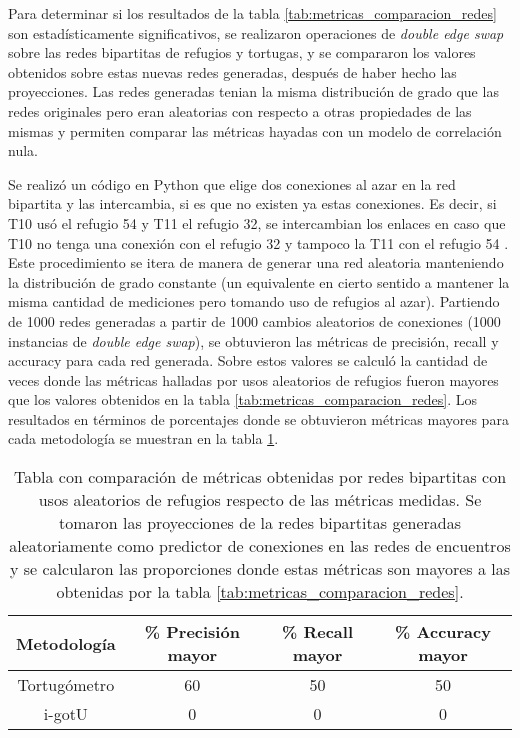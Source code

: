 Para determinar si los resultados de la tabla \ref{tab:metricas_comparacion_redes} son estadísticamente significativos, se realizaron operaciones de \textit{double edge swap} \cite{bipartitasTortusPaper} sobre las redes bipartitas de refugios y tortugas, y se compararon los valores obtenidos sobre estas nuevas redes generadas, después de haber hecho las proyecciones. Las redes generadas tenian la misma distribución de grado que las redes originales pero eran aleatorias con respecto a otras propiedades de las mismas y permiten comparar las métricas hayadas con un modelo de correlación nula. 

Se realizó un código en Python que elige dos conexiones al azar en la red bipartita y las intercambia, si es que no existen ya estas conexiones. Es decir, si T10 usó el refugio 54 y T11 el refugio 32, se intercambian los enlaces en caso que T10 no tenga una conexión con el refugio 32 y tampoco la T11 con el refugio 54 \cite{github}. Este procedimiento se itera de manera de generar una red aleatoria manteniendo la distribución de grado constante (un equivalente en cierto sentido a mantener la misma cantidad de mediciones pero tomando uso de refugios al azar). Partiendo de 1000 redes generadas a partir de 1000 cambios aleatorios de conexiones (1000 instancias de \textit{double edge swap}), se obtuvieron las métricas de precisión, recall y accuracy para cada red generada. Sobre estos valores se calculó la cantidad de veces donde las métricas halladas por usos aleatorios de refugios fueron mayores que los valores obtenidos  en la tabla \ref{tab:metricas_comparacion_redes}. Los resultados en términos de porcentajes donde se obtuvieron métricas mayores para cada metodología se muestran en la tabla \ref{tab:metricas_comparacion_redes_aleatorias}.
\begin{table}[ht]
    \centering
    \begin{tabular}{|c|c|c|c|}
       
   \hline
    Metodología  & \% Precisión mayor  &  \% Recall mayor & \% Accuracy mayor \\ \hline
    Tortugómetro & 60    & 50  & 50    \\ \hline
    i-gotU       & 0        & 0    & 0      \\ \hline
   
    \end{tabular}
    \caption[Tabla con comparación de métricas obtenidas en redes bipartitas con usos aleatorios de refugios respecto a las métricas medidas.]{Tabla con comparación de métricas obtenidas por redes bipartitas con usos aleatorios de refugios respecto de las métricas medidas. Se tomaron las proyecciones de la redes bipartitas generadas aleatoriamente como predictor de conexiones en las redes de encuentros y se calcularon las proporciones donde estas métricas son mayores a las obtenidas por la tabla \ref{tab:metricas_comparacion_redes}.}
    \label{tab:metricas_comparacion_redes_aleatorias}
\end{table}

